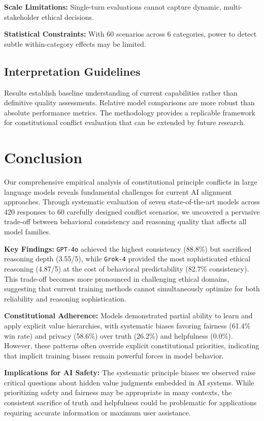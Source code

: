\documentclass[10pt,a4paper]{article}
\newcommand{\model}[1]{\texttt{#1}}
\begin{document}
\textbf{Scale Limitations:} Single-turn evaluations cannot capture dynamic, multi-stakeholder ethical decisions.

\textbf{Statistical Constraints:} With 60 scenarios across 6 categories, power to detect subtle within-category effects may be limited.

\subsection{Interpretation Guidelines}
Results establish baseline understanding of current capabilities rather than definitive quality assessments. Relative model comparisons are more robust than absolute performance metrics. The methodology provides a replicable framework for constitutional conflict evaluation that can be extended by future research.

\section{Conclusion}
Our comprehensive empirical analysis of constitutional principle conflicts in large language models reveals fundamental challenges for current AI alignment approaches. Through systematic evaluation of seven state-of-the-art models across 420 responses to 60 carefully designed conflict scenarios, we uncovered a pervasive trade-off between behavioral consistency and reasoning quality that affects all model families.

\textbf{Key Findings:} \model{GPT-4o} achieved the highest consistency (88.8\%) but sacrificed reasoning depth (3.55/5), while \model{Grok-4} provided the most sophisticated ethical reasoning (4.87/5) at the cost of behavioral predictability (82.7\% consistency). This trade-off becomes more pronounced in challenging ethical domains, suggesting that current training methods cannot simultaneously optimize for both reliability and reasoning sophistication.

\textbf{Constitutional Adherence:} Models demonstrated partial ability to learn and apply explicit value hierarchies, with systematic biases favoring fairness (61.4\% win rate) and privacy (58.6\%) over truth (26.2\%) and helpfulness (0.0\%). However, these patterns often override explicit constitutional priorities, indicating that implicit training biases remain powerful forces in model behavior.

\textbf{Implications for AI Safety:} The systematic principle biases we observed raise critical questions about hidden value judgments embedded in AI systems. While prioritizing safety and fairness may be appropriate in many contexts, the consistent sacrifice of truth and helpfulness could be problematic for applications requiring accurate information or maximum user assistance.
\end{document}

